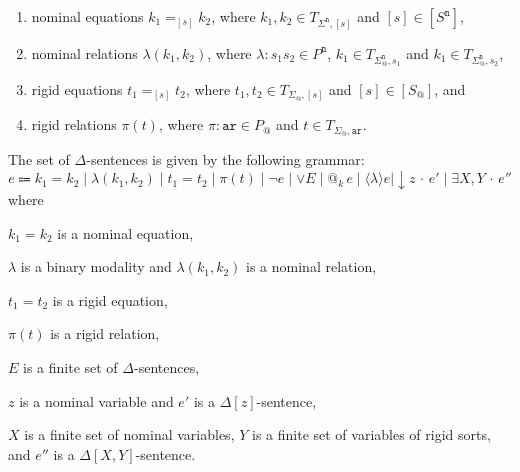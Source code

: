 \documentclass{article}
\makeatletter
\newcommand{\ari}{\mathtt{ar}}
\newcommand{\nom}{\mathtt{n}}
\newcommand{\at}[1]{@_{#1}\,}
\newcommand{\pos}[1]{\langle #1 \rangle}
\newcommand{\store}[1]{{\downarrow}#1\,{\cdot}\,}
\newcommand{\Exists}[1]{\exists #1\,{\cdot}\,}
\makeatother
\begin{document}
\begin{enumerate}
 \item nominal equations $k_1=_{[s]} k_2$, where $k_1,k_2\in T_{\Sigma^\nom,[s]}$ and $[s]\in [S^\nom]$,

 \item nominal relations $\lambda(k_1,k_2)$, where $\lambda \colon s_1 s_2\in P^\nom$,  $k_1\in T_{\Sigma^\nom_@,s_1}$ and $k_1\in T_{\Sigma^\nom_@,s_2}$,

 \item rigid equations $t_1=_{[s]} t_2$, where $t_1,t_2\in T_{\Sigma_@,[s]}$ and $[s]\in [S_@]$, and

 \item rigid relations $\pi(t)$, where $\pi\colon\ari \in P_@$ and $t\in T_{\Sigma_@,\ari}$.
\end{enumerate}
 The set of $\Delta$-sentences is given by the following grammar:
$$e\Coloneqq k_1=k_2 \mid\lambda(k_1,k_2)\mid t_1=t_2 \mid \pi(t) \mid  \neg e\mid \vee E\mid \at{k} e\mid \pos{\lambda}e \mid \store{z}e'\mid \Exists{X,Y}e''$$
where 
\begin{enumerate*}[label=(\alph*)]
 \item $k_1=k_2$ is a nominal equation,
 \item $\lambda$ is a binary modality and $\lambda(k_1,k_2)$ is a nominal relation,
 \item $t_1=t_2$ is a rigid equation,
 \item $\pi(t)$ is a rigid relation,
 \item $E$ is a finite set of $\Delta$-sentences,
 \item $z$ is a nominal variable and $e'$ is a $\Delta[z]$-sentence,
 \item $X$ is a finite set of nominal variables,
       $Y$ is a finite set of variables of rigid sorts, and
       $e''$ is a $\Delta[X,Y]$-sentence.
\end{enumerate*}


\end{document}
